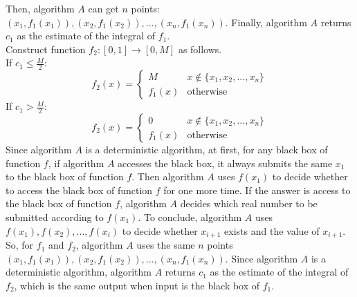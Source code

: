 Then, algorithm $A$ can get $n$ points: $(x_1,f_1(x_1)),(x_2,f_1(x_2)),...,(x_n,f_1(x_n))$.
Finally, algorithm $A$ returns $c_1$ as the estimate of the integral of $f_1$.\\
Construct function $f_2:[0, 1]\rightarrow [0, M ]$ as follows. \\
If $c_1 \le \frac{M}{2}$:
\begin{equation}
   \nonumber  f_2(x)=
    \begin{cases}
    M& x\notin\{x_1,x_2,...,x_n\}\\
    f_1(x)& \text{otherwise}
    \end{cases}
\end{equation}
If $c_1 > \frac{M}{2}$:
\begin{equation}
   \nonumber  f_2(x)=
    \begin{cases}
    0& x\notin\{x_1,x_2,...,x_n\}\\
    f_1(x)& \text{otherwise}
    \end{cases}
\end{equation}
Since algorithm $A$ is a deterministic algorithm, 
at first, 
for any black box of function $f$, if algorithm $A$ accesses the black box,
it always submits the same $x_1$ to the black box of function $f$.
Then algorithm $A$ uses $f(x_1)$ to decide whether to access the black box of function $f$ for one more time.
If the answer is access to the black box of function $f$, algorithm $A$ decides which real number to be submitted according to $f(x_1)$.
To conclude, algorithm $A$ uses $f(x_1), f(x_2),...,f(x_i)$ to decide whether $x_{i+1}$ exists and the value of $x_{i+1}$.
So, for $f_1$ and $f_2$, algorithm $A$ uses the same $n$ points $(x_1,f_1(x_1)),(x_2,f_1(x_2)),...,(x_n,f_1(x_n))$.
Since algorithm $A$ is a deterministic algorithm, 
algorithm $A$ returns $c_1$ as the estimate of the integral of $f_2$, which is the same output when input is the black box of $f_1$.
